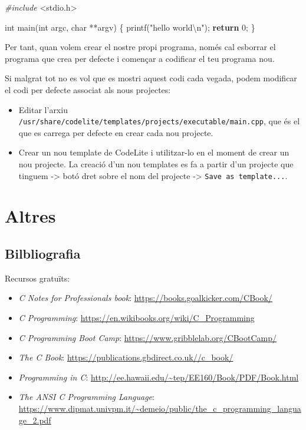 \documentclass[]{book}
\newenvironment{Shaded}{\begin{snugshade}}{\end{snugshade}}
\newcommand{\DataTypeTok}[1]{\textcolor[rgb]{0.13,0.29,0.53}{#1}}
\newcommand{\DecValTok}[1]{\textcolor[rgb]{0.00,0.00,0.81}{#1}}
\newcommand{\SpecialCharTok}[1]{\textcolor[rgb]{0.00,0.00,0.00}{#1}}
\newcommand{\StringTok}[1]{\textcolor[rgb]{0.31,0.60,0.02}{#1}}
\newcommand{\ImportTok}[1]{#1}
\newcommand{\ControlFlowTok}[1]{\textcolor[rgb]{0.13,0.29,0.53}{\textbf{#1}}}
\newcommand{\PreprocessorTok}[1]{\textcolor[rgb]{0.56,0.35,0.01}{\textit{#1}}}
\newcommand{\NormalTok}[1]{#1}
\providecommand{\tightlist}{%
  \setlength{\itemsep}{0pt}\setlength{\parskip}{0pt}}
\begin{document}
\begin{Shaded}
\begin{Highlighting}[]
\PreprocessorTok{#include }\ImportTok{<stdio.h>}

\DataTypeTok{int}\NormalTok{ main(}\DataTypeTok{int}\NormalTok{ argc, }\DataTypeTok{char}\NormalTok{ **argv)}
\NormalTok{\{}
\NormalTok{    printf(}\StringTok{"hello world}\SpecialCharTok{\textbackslash{}n}\StringTok{"}\NormalTok{);}
    \ControlFlowTok{return} \DecValTok{0}\NormalTok{;}
\NormalTok{\}}
\end{Highlighting}
\end{Shaded}

Per tant, quan volem crear el nostre propi programa, només cal esborrar
el programa que crea per defecte i començar a codificar el teu programa
nou.

Si malgrat tot no es vol que es mostri aquest codi cada vegada, podem
modificar el codi per defecte associat als nous projectes:

\begin{itemize}
\tightlist
\item
  Editar l'arxiu
  \texttt{/usr/share/codelite/templates/projects/executable/main.cpp},
  que és el que es carrega per defecte en crear cada nou projecte.
\item
  Crear un nou template de CodeLite i utilitzar-lo en el moment de crear
  un nou projecte. La creació d'un nou templates es fa a partir d'un
  projecte que tinguem -\textgreater{} botó dret sobre el nom del
  projecte -\textgreater{} \texttt{Save\ as\ template...}.
\end{itemize}

\chapter{Altres}\label{altres}

\section{Bilbliografia}\label{bilbliografia}

Recursos gratuïts:

\begin{itemize}
\tightlist
\item
  \emph{C Notes for Professionals book}:
  \url{https://books.goalkicker.com/CBook/}
\item
  \emph{C Programming}:
  \url{https://en.wikibooks.org/wiki/C_Programming}
\item
  \emph{C Programming Boot Camp}:
  \url{https://www.gribblelab.org/CBootCamp/}
\item
  \emph{The C Book}: \url{https://publications.gbdirect.co.uk//c_book/}
\item
  \emph{Programming in C}:
  \url{http://ee.hawaii.edu/~tep/EE160/Book/PDF/Book.html}
\item
  \emph{The ANSI C Programming Language}:
  \url{https://www.dipmat.univpm.it/~demeio/public/the_c_programming_language_2.pdf}
\end{itemize}


\end{document}
